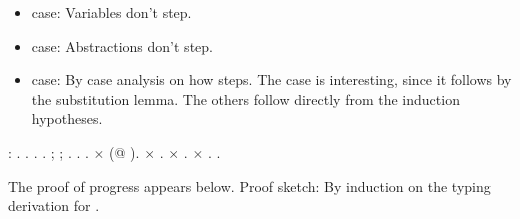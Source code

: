 \documentclass[12pt]{report}
\begin{document}
\begin{itemize}
\item  {} case: Variables don't step.



\item  {} case: Abstractions don't step.



\item  {} case: By case analysis on how  steps. The
         case is interesting, since it follows by the
        substitution lemma.  The others follow directly from the
        induction hypotheses. 

\end{itemize}
\begin{coqdoccode}
\coqdocemptyline
\coqdocnoindent
{}  : .\coqdoceol
\coqdocnoindent
{}.\coqdoceol
\coqdocindent{1.00em}
 .  .\coqdoceol
\coqdocindent{1.00em}
 ;   ;  .\coqdoceol
\coqdocindent{1.00em}
 .  . \ensuremath{\times} (@ ).\coqdoceol
\coqdocindent{1.50em}
\ensuremath{\times} .\coqdoceol
\coqdocindent{1.00em}
\ensuremath{\times} .\coqdoceol
\coqdocindent{1.00em}
\ensuremath{\times} .\coqdoceol
\coqdocnoindent
{}.\coqdoceol
\coqdocemptyline
\end{coqdoccode}
The proof of progress appears below.
    Proof sketch: By induction on the typing derivation for .
\end{document}
